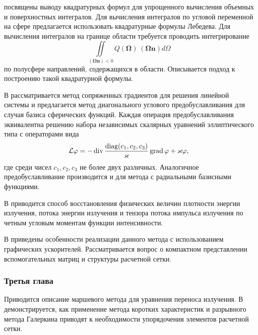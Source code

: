  посвящены выводу квадратурных формул для упрощенного вычисления объемных и поверхностных интегралов. Для вычисления интегралов по угловой переменной на сфере предлагается использовать квадратурные формулы Лебедева. Для вычисления интегралов на границе области требуется проводить интегрирование
\[
\iint\limits_{(\boldsymbol \Omega \mathbf n) < 0}  Q(\boldsymbol \Omega)\: (\boldsymbol \Omega \mathbf n) d\Omega
\]
по полусфере направлений, содержащихся в области. Описывается подход к построению такой квадратурной формулы. 

В  рассматривается метод сопряженных градиентов для решения линейной системы и предлагается метод диагонального углового предобуславливания для случая базиса сферических функций. Каждая операция предобуславливания эквивалентна решению набора независимых скалярных уравнений эллиптического типа с операторами вида
\[
\mathcal{L}\varphi = -\operatorname{div} \frac{\operatorname{diag}(c_1, c_2, c_3)}{\varkappa}\operatorname{grad} \varphi + \varkappa \varphi,
\]
где среди чисел $c_1, c_2, c_3$ не более двух различных. Аналогичное предобуславливание производится и для метода с радиальными базисными функциями.

В  приводится способ восстановления физических величин плотности энергии излучения, потока энергии излучения и тензора потока импульса излучения по четным угловым моментам функции интенсивности.

В  приведены особенности реализации данного метода с использованием графических ускорителей. Рассматривается вопрос о компактном представлении вспомогательных матриц и структуры расчетной сетки.


\subsubsection*{Третья глава}
Приводится описание маршевого метода для уравнения переноса излучения. В  демонстрируется, как применение метода коротких характеристик и разрывного метода Галеркина приводят к необходимости упорядочения элементов расчетной сетки.

